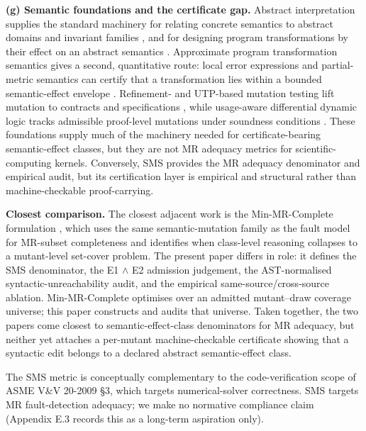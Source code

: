 \documentclass[12pt]{article}
\begin{document}
\textbf{(g) Semantic foundations and the certificate gap.} Abstract
interpretation supplies the standard machinery for relating concrete
semantics to abstract domains and invariant families \citep{46aba24d3e925f6d8d2efd5b5f6ee0d5ea7558cd},
and for designing program transformations by their effect on an
abstract semantics \citep{72269d5ab33ed790ece6856ba0309ed070d83622}. Approximate program
transformation semantics gives a second, quantitative route: local error
expressions and partial-metric semantics can certify that a
transformation lies within a bounded semantic-effect envelope \citep{11efca8804ed387c9cc3956868f0eb43597c8d10,6d492b783178b02dae163fbfe837857b982deed2}. Refinement- and
UTP-based mutation testing lift mutation to contracts and
specifications \citep{92d99528fe8e70345901cf56aa4d1037f0c3aa96,97a550b469c6151734d1220e37a7985d896191ee}, while
usage-aware differential dynamic logic tracks admissible proof-level
mutations under soundness conditions \citep{7a867d014c3e10e45e4220c5dcf605e8df6ef38d}. These foundations supply much of the machinery needed for
certificate-bearing semantic-effect classes, but they are not MR
adequacy metrics for scientific-computing kernels. Conversely, SMS
provides the MR adequacy denominator and empirical audit, but its
certification layer is empirical and structural rather than
machine-checkable proof-carrying.

\textbf{Closest comparison.} The closest adjacent work is the
Min-MR-Complete formulation \citep{ecf4ccd0f2897516b0205a4b1e35ea81b68aa277}, which uses
the same semantic-mutation family as the fault model for MR-subset
completeness and identifies when class-level reasoning collapses to a
mutant-level set-cover problem. The present paper differs in role: it
defines the SMS denominator, the E1 $\wedge$ E2 admission judgement, the
AST-normalised syntactic-unreachability audit, and the empirical
same-source/cross-source ablation. Min-MR-Complete optimises over an
admitted mutant--draw coverage universe; this paper constructs and
audits that universe. Taken together, the two papers come closest to
semantic-effect-class denominators for MR adequacy, but neither yet
attaches a per-mutant machine-checkable certificate showing that a
syntactic edit belongs to a declared abstract semantic-effect class.

The SMS metric is conceptually complementary to the code-verification
scope of ASME V\&V 20-2009 §3, which targets numerical-solver
correctness. SMS targets MR fault-detection adequacy; we make no
normative compliance claim (Appendix E.3 records this as a long-term
aspiration only).
\end{document}
